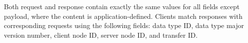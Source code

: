 Both request and response contain exactly the same values for all fields except payload,
where the content is application-defined.
Clients match responses with corresponding requests using the following fields:
data type ID, data type major version number, client node ID, server node ID, and transfer ID.
